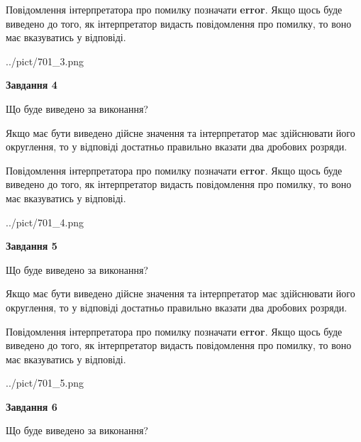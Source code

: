 \documentclass[12pt, ukrainian]{article}
\begin{document}
{\begin {Large}
Повідомлення інтерпретатора про помилку позначати \textbf{error}.
Якщо щось буде виведено до того, як інтерпретатор видасть повідомлення про помилку, 
то воно має вказуватись у відповіді. \par

\begin{center}
	{../pict/701_3.png}
\end{center}
\newpage

{\begin {center}\textbf{Завдання 4}\end {center}}\par
Що буде виведено за виконання? \par

Якщо має бути виведено дійсне значення та інтерпретатор має здійснювати його округлення, 
то у відповіді достатньо правильно вказати два дробових розряди.

Повідомлення інтерпретатора про помилку позначати \textbf{error}.
Якщо щось буде виведено до того, як інтерпретатор видасть повідомлення про помилку, 
то воно має вказуватись у відповіді. \par

\begin{center}
	{../pict/701_4.png}
\end{center}
\newpage

{\begin {center}\textbf{Завдання 5}\end {center}}\par
Що буде виведено за виконання? \par

Якщо має бути виведено дійсне значення та інтерпретатор має здійснювати його округлення, 
то у відповіді достатньо правильно вказати два дробових розряди.

Повідомлення інтерпретатора про помилку позначати \textbf{error}.
Якщо щось буде виведено до того, як інтерпретатор видасть повідомлення про помилку, 
то воно має вказуватись у відповіді. \par

\begin{center}
	{../pict/701_5.png}
\end{center}
\newpage

{\begin {center}\textbf{Завдання 6}\end {center}}\par
Що буде виведено за виконання? \par


\end{Large}}
\end{document}
